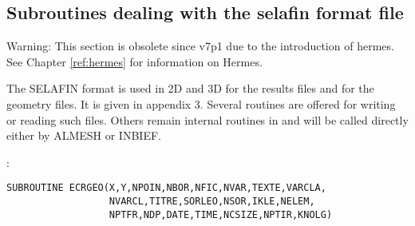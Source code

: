 %

\subsection{Subroutines dealing with the selafin format file}
\begin{WarningBlock}{Warning:}
  This section is obsolete since v7p1 due to the introduction of hermes. See Chapter \ref{ref:hermes} for information on Hermes.
\end{WarningBlock}

The SELAFIN format is used in 2D and 3D for the results files and for the
geometry files. It is given in appendix 3. Several routines are offered for
writing or reading such files. Others remain internal routines in \bief and will
be called directly either by ALMESH or INBIEF.

:
\begin{lstlisting}[language=TelFortran]
SUBROUTINE ECRGEO(X,Y,NPOIN,NBOR,NFIC,NVAR,TEXTE,VARCLA,
                  NVARCL,TITRE,SORLEO,NSOR,IKLE,NELEM,
                  NPTFR,NDP,DATE,TIME,NCSIZE,NPTIR,KNOLG)
\end{lstlisting}

